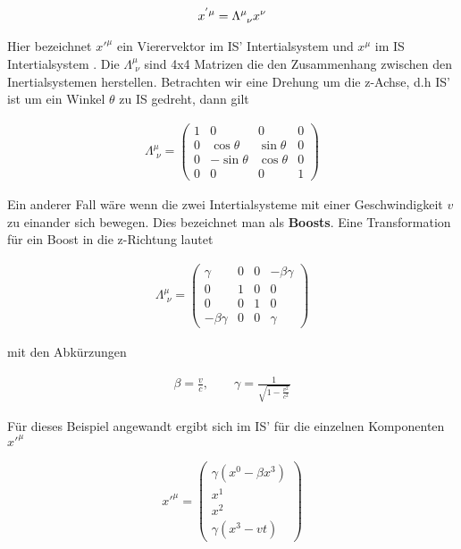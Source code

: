 \begin{align}
  \label{eq:11}
  x^{'\mu}=\Lambda^\mu_{\hphantom\mu \nu}x^\nu
\end{align}

Hier bezeichnet \(x'^\mu\) ein Vierervektor im IS' Intertialsystem und \(x^\mu\) im IS Intertialsystem . Die \(\Lambda^\mu_{\,\, \nu}\) sind 4x4 Matrizen die den Zusammenhang zwischen den Inertialsystemen herstellen. Betrachten wir eine Drehung um die z-Achse, d.h IS' ist um ein Winkel \(\theta\) zu IS gedreht, dann gilt

\begin{align}
  \label{eq:12}
  \Lambda^\mu_{\,\, \nu} =
  \begin{pmatrix}
    1&0&0&0\\
0&\cos\theta&\sin\theta&0\\
0&-\sin\theta&\cos\theta&0\\
    0&0&0&1
  \end{pmatrix}
\end{align}

Ein anderer Fall wäre wenn die zwei Intertialsysteme mit einer Geschwindigkeit \(v\) zu einander sich bewegen. Dies bezeichnet man als \textbf{Boosts}. Eine Transformation für ein Boost in die z-Richtung lautet

\begin{align}
  \label{eq:13}
  \Lambda^\mu_{\,\, \nu} =
  \begin{pmatrix}
    \gamma&0&0&-\beta\gamma\\
0&1&0&0\\
0&0&1&0\\
    -\beta\gamma&0&0&\gamma
  \end{pmatrix}
\end{align}

mit den Abkürzungen

\begin{align}
  \label{eq:14}
  \beta = \frac{v}{c} ,\qquad \gamma = \frac{1}{\sqrt{1-\frac{v^2}{c^2}}}
\end{align}


Für dieses Beispiel angewandt ergibt sich im IS' für die einzelnen Komponenten \(x'^\mu\)

\begin{align}
  \label{eq:15}
  x'^\mu =
  \begin{pmatrix}
     \gamma(x^0-\beta x^3)\\
     x^1\\
     x^2\\
 \gamma(x^3-vt)
  \end{pmatrix}
\end{align}

